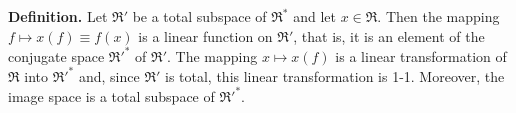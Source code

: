 \textbf{Definition.} Let $\mathfrak{R}'$ be a total subspace of $\mathfrak{R}^*$ and let $x \in \mathfrak{R}$. Then the mapping $f \mapsto x(f) \equiv f(x)$ is a linear function on $\mathfrak{R}'$, that is, it is an element of the conjugate space $\mathfrak{R}'^*$ of $\mathfrak{R}'$. The mapping $x \mapsto x(f)$ is a linear transformation of $\mathfrak{R}$ into $\mathfrak{R}'^*$ and, since $\mathfrak{R}'$ is total, this linear transformation is 1-1. Moreover, the image space is a total subspace of $\mathfrak{R}'^*$.
